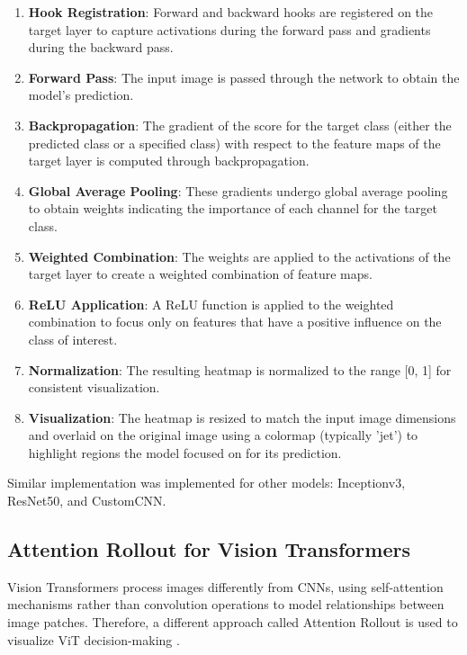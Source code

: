 \documentclass[a4paper,12pt]{report}
\begin{document}
\begin{enumerate}
    \item \textbf{Hook Registration}: Forward and backward hooks are registered on the target layer to capture activations during the forward pass and gradients during the backward pass.
    
    \item \textbf{Forward Pass}: The input image is passed through the network to obtain the model's prediction.
    
    \item \textbf{Backpropagation}: The gradient of the score for the target class (either the predicted class or a specified class) with respect to the feature maps of the target layer is computed through backpropagation.
    
    \item \textbf{Global Average Pooling}: These gradients undergo global average pooling to obtain weights indicating the importance of each channel for the target class.
    
    \item \textbf{Weighted Combination}: The weights are applied to the activations of the target layer to create a weighted combination of feature maps.
    
    \item \textbf{ReLU Application}: A ReLU function is applied to the weighted combination to focus only on features that have a positive influence on the class of interest.
    
    \item \textbf{Normalization}: The resulting heatmap is normalized to the range [0, 1] for consistent visualization.
    
    \item \textbf{Visualization}: The heatmap is resized to match the input image dimensions and overlaid on the original image using a colormap (typically 'jet') to highlight regions the model focused on for its prediction.
\end{enumerate}



Similar implementation was implemented for other models: Inceptionv3, ResNet50, and CustomCNN. 

\subsection{Attention Rollout for Vision Transformers}

Vision Transformers process images differently from CNNs, using self-attention mechanisms rather than convolution operations to model relationships between image patches. Therefore, a different approach called Attention Rollout is used to visualize ViT decision-making \citep{abnar2020attention}.
\end{document}

